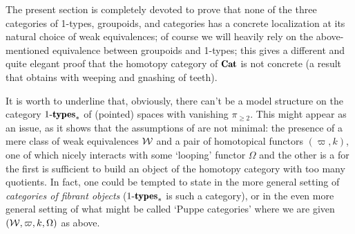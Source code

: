 \documentclass[a4paper, 10pt]{amsart}
\begin{document}
The present section is completely devoted to prove that none of the three categories of 1-types, groupoids, and categories has a concrete localization at its natural choice of weak equivalences; of course we will heavily rely on the above-mentioned equivalence between groupoids and 1-types; this gives a different and quite elegant proof that the homotopy category of $\Cat$ is not concrete (a result that \cite[§4.1]{fconc} obtains with weeping and gnashing of teeth).

It is worth to underline that, obviously, there can't be a model structure on the category $1\text{-}\cate{types}_*$ of (pointed) spaces with vanishing $\pi_{\ge 2}$. This might appear as an issue, as it shows that the assumptions of \athm{} are not minimal: the presence of a mere class of weak equivalences $\mathcal{W}$ and a pair of homotopical functors $(\varpi,k)$, one of which nicely interacts with some `looping' functor $\Omega$ and the other is a \wco for the first is sufficient to build an object of the homotopy category with too many quotients. In fact, one could be tempted to state \athm{} in the more general setting of \emph{categories of fibrant objects} ($1\text{-}\cate{types}_*$ is such a category), or in the even more general setting of what might be called `Puppe categories' where we are given $(\mathcal{W},\varpi,k,\Omega)$ as above.
\end{document}

